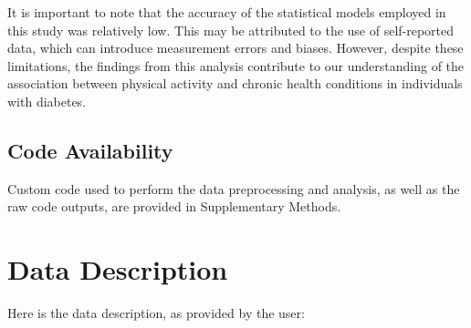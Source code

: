 \documentclass[11pt]{article}
\begin{document}
It is important to note that the accuracy of the statistical models employed in this study was relatively low. This may be attributed to the use of self-reported data, which can introduce measurement errors and biases. However, despite these limitations, the findings from this analysis contribute to our understanding of the association between physical activity and chronic health conditions in individuals with diabetes.\subsection*{Code Availability}

Custom code used to perform the data preprocessing and analysis, as well as the raw code outputs, are provided in Supplementary Methods.


\clearpage
\appendix

\section{Data Description} \label{sec:data_description} Here is the data description, as provided by the user:
\end{document}
